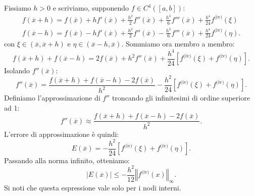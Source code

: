 Fissiamo $h >0$ e scriviamo, supponendo $f\in C^{4}([ a,b])$:
\begin{gather*}
f(\overline{x} +h) =f(\overline{x}) +hf'(\overline{x}) +\frac{h^{2}}{2} f''(\overline{x}) +\frac{h^{3}}{6} f'''(\overline{x}) +\frac{h^{4}}{24} f^{\text{(iv)}}( \xi )\\
f(\overline{x} -h) =f(\overline{x}) -hf'(\overline{x}) +\frac{h^{2}}{2} f''(\overline{x}) -\frac{h^{3}}{6} f'''(\overline{x}) +\frac{h^{4}}{24} f^{\text{(iv)}}( \eta ).
\end{gather*}
con $\xi \in (\overline{x} ,\overline{x} +h)$ e $\eta \in (\overline{x} -h,\overline{x})$.
Sommiamo ora membro a membro:
\begin{equation*}
f(\overline{x} +h) +f(\overline{x} -h) =2f(\overline{x}) +h^{2} f''(\overline{x}) +\frac{h^{4}}{24}\left[ f^{\text{(iv)}}( \xi ) +f^{\text{(iv)}}( \eta )\right].
\end{equation*}
Isolando $f''(\overline{x})$:
\begin{equation*}
f''(\overline{x}) =\frac{f(\overline{x} +h) +f(\overline{x} -h) -2f(\overline{x})}{h^{2}} -\frac{h^{2}}{24}\left[ f^{\text{(iv)}}( \xi ) +f^{\text{(iv)}}( \eta )\right].
\end{equation*}
Definiamo l'approssimazione di $f''$ troncando gli infinitesimi di ordine superiore ad 1:
\begin{equation*}
f''(\overline{x}) \approx \frac{f(\overline{x} +h) +f(\overline{x} -h) -2f(\overline{x})}{h^{2}}.
\end{equation*}
L'errore di approssimazione è quindi:
\begin{equation*}
E(\overline{x}) =-\frac{h^{2}}{24}\left[ f^{\text{(iv)}}( \xi ) +f^{\text{(iv)}}( \eta )\right].
\end{equation*}
Passando alla norma infinito, otteniamo:
\begin{equation*}
| E(\overline{x})| \leqslant -\frac{h^{2}}{12}\left\Vert f^{\text{(iv)}}(x)\right\Vert _{\infty }.
\end{equation*}
Si noti che questa espressione vale solo per i nodi interni.
